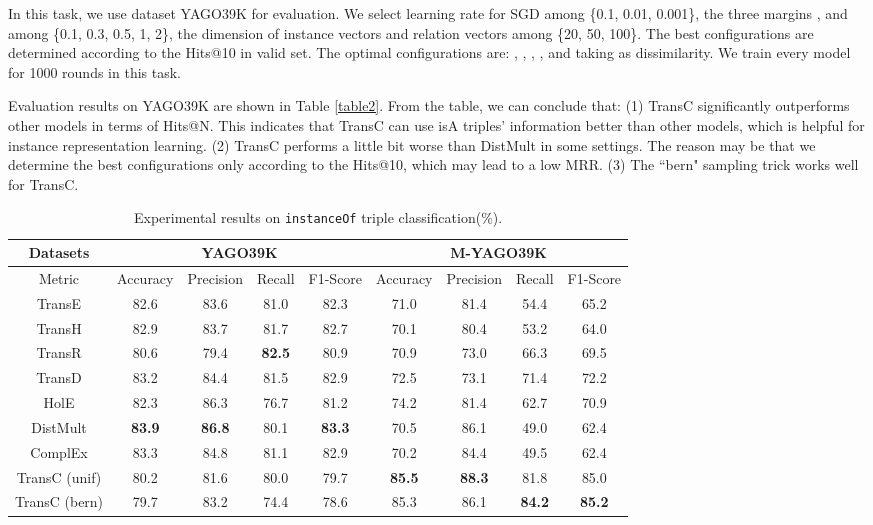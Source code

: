 \documentclass[11pt,a4paper]{article}
\begin{document}
  In this task, we use dataset YAGO39K for evaluation. We select 
  learning rate  for SGD among \{0.1, 0.01, 0.001\}, the three margins ,  and 
  among \{0.1, 0.3, 0.5, 1, 2\}, the dimension of instance vectors and relation vectors  among \{20, 50, 100\}.
  The best configurations are determined according to the Hits@10 in valid set. The optimal configurations are: 
  , , , ,  and taking  as dissimilarity.
  We train every model for 1000 rounds in this task.
  
  Evaluation results on YAGO39K are shown in Table \ref{table2}. From the table, we can conclude that: (1) TransC significantly outperforms other
  models in terms of Hits@N. This indicates
  that TransC can use isA triples' information better than other models, which is helpful for instance representation learning.
  (2) TransC performs a little bit worse than DistMult in some settings. 
  The reason may be that we determine the 
  best configurations only according to the Hits@10, which may lead to a low MRR. (3) The ``bern" sampling trick works well for 
  TransC.
  
  \begin{table*}[!htb]
    \centering
    \setlength{\belowcaptionskip}{-1pt}
    \small
        \begin{tabular}{c|cccc|cccc}
        \hline
        Datasets & \multicolumn{4}{c|}{YAGO39K} & \multicolumn{4}{c}{M-YAGO39K}\\
        \hline
        \multirow{1}{*}{Metric} & Accuracy & Precision & Recall & F1-Score & Accuracy & Precision & Recall & F1-Score \\
        \hline
        TransE  & 82.6  & 83.6  & 81.0   & 82.3 & 71.0   & 81.4  & 54.4   & 65.2   \\
        TransH  & 82.9  & 83.7   & 81.7   & 82.7 & 70.1  & 80.4   & 53.2   & 64.0  \\
        TransR  & 80.6  & 79.4   & \textbf{82.5}   & 80.9  & 70.9  & 73.0   & 66.3   & 69.5 \\
        TransD  & 83.2  & 84.4   & 81.5   & 82.9   & 72.5  & 73.1   & 71.4   & 72.2\\
        HolE    & 82.3  & 86.3   & 76.7   & 81.2 & 74.2  & 81.4   & 62.7   & 70.9  \\
        DistMult & \textbf{83.9}  & \textbf{86.8}   & 80.1   & \textbf{83.3} & 70.5  & 86.1   & 49.0   & 62.4  \\
        ComplEx & 83.3  & 84.8   & 81.1   & 82.9 & 70.2  & 84.4   & 49.5   & 62.4  \\
        \hline
        TransC (unif)  & 80.2  & 81.6   & 80.0   & 79.7  & \textbf{85.5}  & \textbf{88.3}   & 81.8   & 85.0 \\
        TransC (bern)  & 79.7  & 83.2   & 74.4   & 78.6 & 85.3  & 86.1   & \textbf{84.2}   & \textbf{85.2} \\
        \hline
        \end{tabular}
        \caption{\label{table3}Experimental results on \texttt{instanceOf} triple classification(\%).}
    \end{table*}
  
\end{document}
